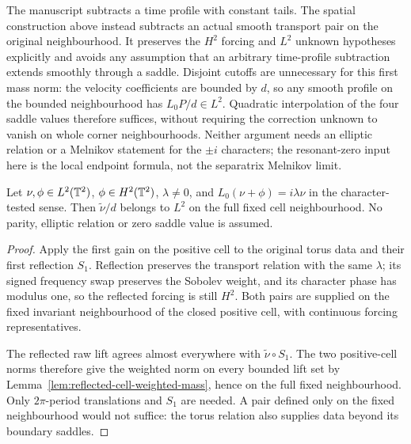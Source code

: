\begin{remark}
The manuscript subtracts a time profile with constant tails. The spatial
construction above instead subtracts an actual smooth transport pair on
the original neighbourhood. It preserves the $H^2$ forcing and $L^2$
unknown hypotheses explicitly and avoids any assumption that an arbitrary
time-profile subtraction extends smoothly through a saddle.
Disjoint cutoffs are unnecessary for this first mass norm: the velocity
coefficients are bounded by $d$, so any smooth profile on the bounded
neighbourhood has $L_0P/d\in L^2$. Quadratic interpolation of the four
saddle values therefore suffices, without requiring the correction unknown
to vanish on whole corner neighbourhoods.
Neither argument needs an elliptic relation or a Melnikov statement for
the $\pm i$ characters; the resonant-zero input here is the local endpoint
formula, not the separatrix Melnikov limit.
\end{remark}

\begin{corollary}
\label{cor:transport-first-gain-periodic}
\leanok
Let $\nu,\phi\in L^2(\mathbb{T}^2)$, $\phi\in H^2(\mathbb{T}^2)$, $\lambda\ne0$, and
$L_0(\nu+\phi)=i\lambda\nu$ in the character-tested sense.
Then $\widetilde\nu/d$ belongs to $L^2$ on the full fixed cell
neighbourhood. No parity, elliptic relation or zero saddle value is assumed.
\end{corollary}

\begin{proof}
\leanok
Apply the first gain on the positive cell to the original torus data and
their first reflection $S_1$. Reflection preserves the transport relation
with the same $\lambda$; its signed frequency swap preserves the Sobolev
weight, and its character phase has modulus one, so the reflected forcing
is still $H^2$. Both pairs are supplied on the fixed invariant neighbourhood
of the closed positive cell, with continuous forcing representatives.

The reflected raw lift agrees almost everywhere with
$\widetilde\nu\circ S_1$. The two positive-cell norms therefore give the
weighted norm on every bounded lift set by
Lemma~\ref{lem:reflected-cell-weighted-mass}, hence on the full fixed
neighbourhood. Only $2\pi$-period translations and $S_1$ are needed.
A pair defined only on the fixed neighbourhood would not suffice:
the torus relation also supplies data beyond its boundary saddles.
\end{proof}

